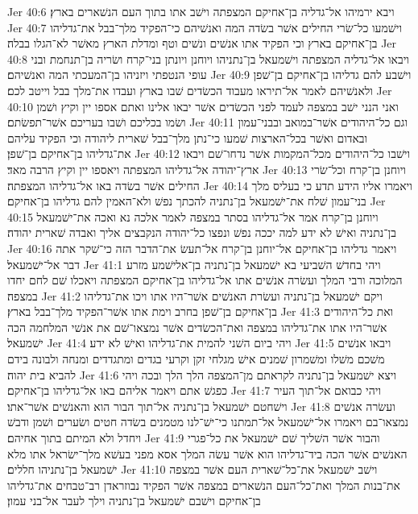 Jer 40:6  ויבא ירמיהו אל־גדליה בן־אחיקם המצפתה וישׁב אתו בתוך העם הנשׁארים בארץ׃
Jer 40:7  וישׁמעו כל־שׂרי החילים אשׁר בשׂדה המה ואנשׁיהם כי־הפקיד מלך־בבל את־גדליהו בן־אחיקם בארץ וכי הפקיד אתו אנשׁים ונשׁים וטף ומדלת הארץ מאשׁר לא־הגלו בבלה׃
Jer 40:8  ויבאו אל־גדליה המצפתה וישׁמעאל בן־נתניהו ויוחנן ויונתן בני־קרח ושׂריה בן־תנחמת ובני עופי הנטפתי ויזניהו בן־המעכתי המה ואנשׁיהם׃
Jer 40:9  וישׁבע להם גדליהו בן־אחיקם בן־שׁפן ולאנשׁיהם לאמר אל־תיראו מעבוד הכשׂדים שׁבו בארץ ועבדו את־מלך בבל וייטב לכם׃
Jer 40:10  ואני הנני ישׁב במצפה לעמד לפני הכשׂדים אשׁר יבאו אלינו ואתם אספו יין וקיץ ושׁמן ושׂמו בכליכם ושׁבו בעריכם אשׁר־תפשׂתם׃
Jer 40:11  וגם כל־היהודים אשׁר־במואב ובבני־עמון ובאדום ואשׁר בכל־הארצות שׁמעו כי־נתן מלך־בבל שׁארית ליהודה וכי הפקיד עליהם את־גדליהו בן־אחיקם בן־שׁפן׃
Jer 40:12  וישׁבו כל־היהודים מכל־המקמות אשׁר נדחו־שׁם ויבאו ארץ־יהודה אל־גדליהו המצפתה ויאספו יין וקיץ הרבה מאד׃
Jer 40:13  ויוחנן בן־קרח וכל־שׂרי החילים אשׁר בשׂדה באו אל־גדליהו המצפתה׃
Jer 40:14  ויאמרו אליו הידע תדע כי בעליס מלך בני־עמון שׁלח את־ישׁמעאל בן־נתניה להכתך נפשׁ ולא־האמין להם גדליהו בן־אחיקם׃
Jer 40:15  ויוחנן בן־קרח אמר אל־גדליהו בסתר במצפה לאמר אלכה נא ואכה את־ישׁמעאל בן־נתניה ואישׁ לא ידע למה יככה נפשׁ ונפצו כל־יהודה הנקבצים אליך ואבדה שׁארית יהודה׃
Jer 40:16  ויאמר גדליהו בן־אחיקם אל־יוחנן בן־קרח אל־תעשׂ את־הדבר הזה כי־שׁקר אתה דבר אל־ישׁמעאל׃
Jer 41:1  ויהי בחדשׁ השׁביעי בא ישׁמעאל בן־נתניה בן־אלישׁמע מזרע המלוכה ורבי המלך ועשׂרה אנשׁים אתו אל־גדליהו בן־אחיקם המצפתה ויאכלו שׁם לחם יחדו במצפה׃
Jer 41:2  ויקם ישׁמעאל בן־נתניה ועשׂרת האנשׁים אשׁר־היו אתו ויכו את־גדליהו בן־אחיקם בן־שׁפן בחרב וימת אתו אשׁר־הפקיד מלך־בבל בארץ׃
Jer 41:3  ואת כל־היהודים אשׁר־היו אתו את־גדליהו במצפה ואת־הכשׂדים אשׁר נמצאו־שׁם את אנשׁי המלחמה הכה ישׁמעאל׃
Jer 41:4  ויהי ביום השׁני להמית את־גדליהו ואישׁ לא ידע׃
Jer 41:5  ויבאו אנשׁים משׁכם משׁלו ומשׁמרון שׁמנים אישׁ מגלחי זקן וקרעי בגדים ומתגדדים ומנחה ולבונה בידם להביא בית יהוה׃
Jer 41:6  ויצא ישׁמעאל בן־נתניה לקראתם מן־המצפה הלך הלך ובכה ויהי כפגשׁ אתם ויאמר אליהם באו אל־גדליהו בן־אחיקם׃
Jer 41:7  ויהי כבואם אל־תוך העיר וישׁחטם ישׁמעאל בן־נתניה אל־תוך הבור הוא והאנשׁים אשׁר־אתו׃
Jer 41:8  ועשׂרה אנשׁים נמצאו־בם ויאמרו אל־ישׁמעאל אל־תמתנו כי־ישׁ־לנו מטמנים בשׂדה חטים ושׂערים ושׁמן ודבשׁ ויחדל ולא המיתם בתוך אחיהם׃
Jer 41:9  והבור אשׁר השׁליך שׁם ישׁמעאל את כל־פגרי האנשׁים אשׁר הכה ביד־גדליהו הוא אשׁר עשׂה המלך אסא מפני בעשׁא מלך־ישׂראל אתו מלא ישׁמעאל בן־נתניהו חללים׃
Jer 41:10  וישׁב ישׁמעאל את־כל־שׁארית העם אשׁר במצפה את־בנות המלך ואת־כל־העם הנשׁארים במצפה אשׁר הפקיד נבוזראדן רב־טבחים את־גדליהו בן־אחיקם וישׁבם ישׁמעאל בן־נתניה וילך לעבר אל־בני עמון׃
